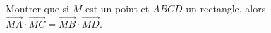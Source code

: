 Montrer que si $M$ est un point et $ABCD$ un rectangle, alors $\overrightarrow{MA} \cdot \overrightarrow{MC} = \overrightarrow{MB} \cdot \overrightarrow{MD}$.
